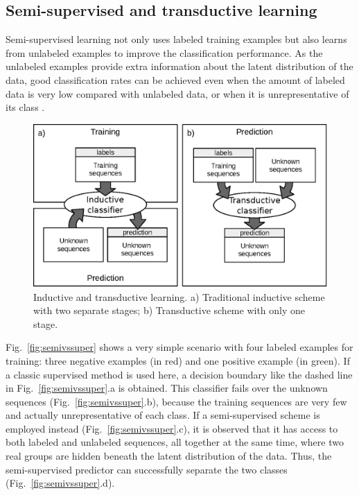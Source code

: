 \documentclass{article}
\begin{document}
\subsection{Semi-supervised and transductive learning} \label{sec:semisupervised}
Semi-supervised learning not only uses labeled training examples but also learns from unlabeled examples to improve the classification performance. As the unlabeled examples provide extra information about the latent distribution of the data, good classification rates can be achieved even when the amount of labeled data is very low compared with unlabeled data, or when it is unrepresentative of its class \citep{chapelle2006semi}.
\begin{figure}[tpb]
	\centering
	\includegraphics[width=0.6\linewidth]{paradigmas.eps}
	\caption{Inductive and transductive learning. a) Traditional inductive scheme with two separate stages; b) Transductive scheme with only one stage.}
	\label{fig:schemes}
\end{figure}
Fig.~\ref{fig:semivssuper} shows a very simple scenario with four labeled examples for training: three negative examples (in red) and one positive example (in green). If a classic supervised method is used here, a decision boundary like the dashed line in Fig.~\ref{fig:semivssuper}.a is obtained. This classifier fails over the unknown sequences (Fig.~\ref{fig:semivssuper}.b), because the training sequences are very few and actually unrepresentative of each class. If a semi-supervised scheme is employed instead (Fig.~\ref{fig:semivssuper}.c), it is observed that it has access to both labeled and unlabeled sequences, all together at the same time, where two real groups are hidden beneath the latent distribution of the data. Thus, the semi-supervised predictor can successfully separate the two classes (Fig.~\ref{fig:semivssuper}.d).	
\end{document}
